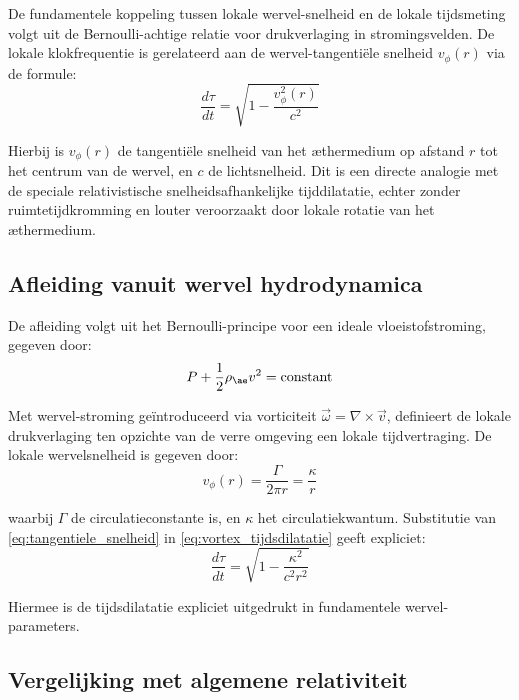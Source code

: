 De fundamentele koppeling tussen lokale wervel-snelheid en de lokale tijdsmeting volgt uit de Bernoulli-achtige relatie voor drukverlaging in stromingsvelden. De lokale klokfrequentie is gerelateerd aan de wervel-tangentiële snelheid $v_{\phi}(r)$ via de formule:
\begin{equation}\label{eq:vortex_tijdsdilatatie}
    \frac{d\tau}{dt} = \sqrt{1 - \frac{v_{\phi}^2(r)}{c^2}}
\end{equation}

Hierbij is $v_{\phi}(r)$ de tangentiële snelheid van het æthermedium op afstand $r$ tot het centrum van de wervel, en $c$ de lichtsnelheid. Dit is een directe analogie met de speciale relativistische snelheidsafhankelijke tijddilatatie, echter zonder ruimtetijdkromming en louter veroorzaakt door lokale rotatie van het æthermedium.

\subsection{Afleiding vanuit wervel hydrodynamica}

De afleiding volgt uit het Bernoulli-principe voor een ideale vloeistofstroming, gegeven door:
\begin{equation}\label{eq:Bernoulli}
    P + \frac{1}{2}\rho_{\ae} v^2 = \text{constant}
\end{equation}

Met wervel-stroming geïntroduceerd via vorticiteit $\vec{\omega} = \nabla \times \vec{v}$, definieert de lokale drukverlaging ten opzichte van de verre omgeving een lokale tijdvertraging. De lokale wervelsnelheid is gegeven door:
\begin{equation}\label{eq:tangentiele_snelheid}
    v_{\phi}(r) = \frac{\Gamma}{2\pi r} = \frac{\kappa}{r}
\end{equation}

waarbij $\Gamma$ de circulatieconstante is, en $\kappa$ het circulatiekwantum. Substitutie van \eqref{eq:tangentiele_snelheid} in \eqref{eq:vortex_tijdsdilatatie} geeft expliciet:
\begin{equation}\label{eq:vortex_tijd_expliciet}
    \frac{d\tau}{dt} = \sqrt{1 - \frac{\kappa^2}{c^2 r^2}}
\end{equation}

Hiermee is de tijdsdilatatie expliciet uitgedrukt in fundamentele wervel-parameters.

\subsection{Vergelijking met algemene relativiteit}

